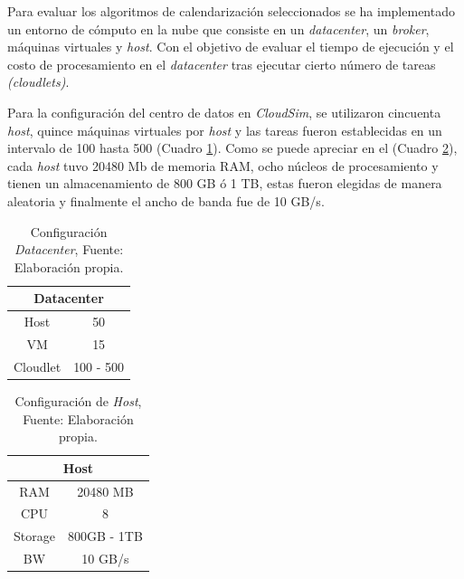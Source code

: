 \documentclass[jou,apacite]{apa6}
\begin{document}
Para evaluar los algoritmos de calendarizaci\'on seleccionados se ha implementado un entorno de c\'omputo en la nube que consiste en un \textit{datacenter}, un \textit{broker}, m\'aquinas virtuales y \textit{host}.  Con el objetivo de evaluar el tiempo de ejecuci\'on y el costo de procesamiento en el \textit{datacenter} tras ejecutar cierto n\'umero de tareas \textit{(cloudlets)}.

Para la configuraci\'on del centro de datos en \textit{CloudSim}, se utilizaron cincuenta \textit{host}, quince m\'aquinas virtuales por \textit{host} y las tareas fueron establecidas en un intervalo de 100 hasta 500 (Cuadro \ref{table:datacenter}).
Como se puede apreciar en el (Cuadro \ref{tab:host}), cada \textit{host} tuvo 20480 Mb de memoria RAM, ocho n\'ucleos de procesamiento y tienen un almacenamiento de 800 GB \'o 1 TB, estas fueron elegidas de manera aleatoria y finalmente el ancho de banda fue de 10 GB/s.

\setcounter{table}{0}
\renewcommand\thetable{\arabic{table}}
\begin{table}[h!]
	\centering
	\begin{tabular}{@{}cc@{}}
		\toprule
		\multicolumn{2}{c}{{\bf Datacenter}} \\ \midrule
		Host              & 50               \\
		VM                & 15                \\
		Cloudlet          & 100 - 500          \\ \bottomrule
		
	\end{tabular}
	\caption{Configuraci\'on \textit{Datacenter}, Fuente: Elaboraci\'on propia.}
	\label{table:datacenter}
\end{table}
 
\setcounter{table}{1}
\renewcommand\thetable{\arabic{table}}
\begin{table}[h!]
	\centering
	\begin{tabular}{@{}cc@{}}
		\toprule
		\multicolumn{2}{c}{{\bf Host}} \\ \midrule
		RAM           & 20480 MB        \\
		CPU           & 8              \\
		Storage       & 800GB - 1TB      \\ 
		BW            & 10 GB/s        
		\\ \bottomrule
	\end{tabular}
	\caption{Configuraci\'on de \textit{Host}, Fuente: Elaboraci\'on propia.}
	\label{tab:host}
\end{table}
\end{document}
